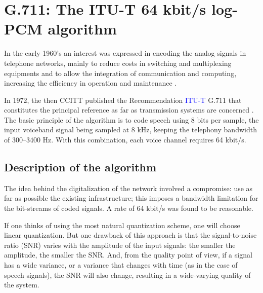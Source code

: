 
%
\chapter{G.711: The ITU-T 64 kbit/s log-PCM algorithm}

In the early 1960's an interest was expressed in encoding the analog signals
in telephone networks, mainly to reduce costs in switching and
multiplexing equipments and to allow the integration of communication
and computing, increasing the efficiency in operation and maintenance
\cite{Qual-meas-tel-sys}.

In 1972, the then CCITT published the Recommendation \textcolor{blue}{ITU-T} G.711 that
constitutes the principal reference as far as transmission systems
are concerned \cite{G.711}. The basic principle of the algorithm is
to code speech using 8 bits per sample, the input voiceband signal
being sampled at 8 kHz, keeping the telephony bandwidth of
300--3400 Hz. With this combination, each voice channel requires
64 kbit/s.

\section{Description of the algorithm}

The idea behind the digitalization of the network involved a
compromise: use as far as possible the existing infrastructure; this imposes a
bandwidth limitation for the bit-streams of coded signals. A rate of 64
kbit/s was found to be reasonable.

If one thinks of using the most natural quantization scheme, one will
choose linear quantization. But one drawback of this approach is that
the signal-to-noise ratio (SNR) varies with the amplitude of the input
signals: the smaller the amplitude, the smaller the SNR. And, from the
quality point of view, if a signal has a wide variance, or a variance
that changes with time (as in the case of speech signals), the SNR
will also change, resulting in a wide-varying quality of the
system.

